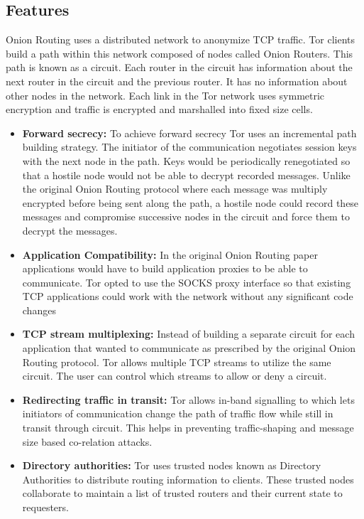 \documentclass{llncs}
\begin{document}
\subsection{Features}
Onion Routing uses a distributed network to anonymize TCP traffic. Tor clients build a path within this network composed of nodes called Onion Routers. This path is known as a circuit. Each router in the circuit has information about the next router in the circuit and the previous router. It has no information about other nodes in the network. Each link in the Tor network uses symmetric encryption and traffic is encrypted and marshalled into fixed size cells. 
\begin{itemize}
	\item[]{\textbf{Forward secrecy:} To achieve forward secrecy Tor uses an incremental path building strategy. The initiator of the communication negotiates session keys with the next node in the path. Keys would be periodically renegotiated so that a hostile node would not be able to decrypt recorded messages. Unlike the original Onion Routing protocol where each message was multiply encrypted before being sent along the path, a hostile node could record these messages and compromise successive nodes in the circuit and force them to decrypt the messages.}
	\item[]{\textbf{Application Compatibility:} In the original Onion Routing paper applications would have to build application proxies to be able to communicate. Tor opted to use the SOCKS proxy interface so that existing TCP applications could work with the network without any significant code changes}
	\item[]{\textbf{TCP stream multiplexing:} Instead of building a separate circuit for each application that wanted to communicate as prescribed by the original Onion Routing protocol. Tor allows multiple TCP streams to utilize the same circuit. The user can control which streams to allow or deny a circuit.}
	\item[]{\textbf{Redirecting traffic in transit:} Tor allows in-band signalling to which lets initiators of communication change the path of traffic flow while still in transit through circuit. This helps in preventing traffic-shaping and message size based co-relation attacks.}
	\item[]{\textbf{Directory authorities:} Tor uses trusted nodes known as Directory Authorities to distribute routing information to clients. These trusted nodes collaborate to maintain a list of trusted routers and their current state to requesters.}

\end{itemize}
\end{document}
